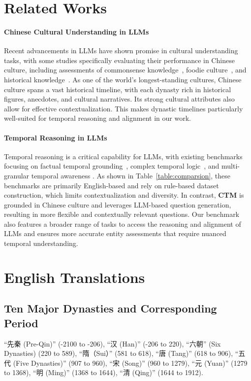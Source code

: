 \section{Related Works}
\label{app:rw}
\paragraph{Chinese Cultural Understanding in LLMs}
Recent advancements in LLMs have shown promise in cultural understanding tasks, with some studies specifically evaluating their performance in Chinese culture, including assessments of commonsense knowledge~\cite{shi2024corecode,sun-etal-2024-benchmarking-chinese,li-etal-2024-cmmlu}, foodie culture~\cite{li-etal-2024-foodieqa}, and historical knowledge~\cite{bai2024baijia}.
As one of the world's longest-standing cultures, Chinese culture spans a vast historical timeline, with each dynasty rich in historical figures, anecdotes, and cultural narratives.
Its strong cultural attributes also allow for effective contextualization. 
This makes dynastic timelines particularly well-suited for temporal reasoning and alignment in our work.

\paragraph{Temporal Reasoning in LLMs}
Temporal reasoning is a critical capability for LLMs, with existing benchmarks focusing on factual temporal grounding~\citep{chen2021a, dhingra-etal-2022-time}, complex temporal logic~\citep{tan-etal-2023-towards,su-etal-2024-living}, and multi-granular temporal awareness \citep{chu-etal-2024-timebench,islakoglu2025chronosense}. 
As shown in Table~\ref{table:comparsion}, these benchmarks are primarily English-based and rely on rule-based dataset construction, which limits contextualization and diversity. 
In contrast, \textbf{CTM} is grounded in Chinese culture and leverages LLM-based question generation, resulting in more flexible and contextually relevant questions. 
Our benchmark also features a broader range of tasks to access the reasoning and alignment of LLMs and ensures more accurate entity assessments that require nuanced temporal understanding.




\section{English Translations}
\subsection{Ten Major Dynasties and Corresponding Period}
``先秦 (Pre-Qin)'' (-2100 to -206), ``汉 (Han)'' (-206 to 220), ``六朝'' (Six Dynasties) (220 to 589), ``隋（Sui）'' (581 to 618), ``唐 (Tang)'' (618 to 906), ``五代 (Five Dynasties)'' (907 to 960), ``宋 (Song)'' (960 to 1279), ``元 (Yuan)'' (1279 to 1368),  ``明 (Ming)'' (1368 to 1644), ``清 (Qing)'' (1644 to 1912).

